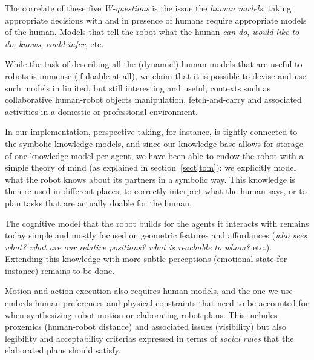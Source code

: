 \documentclass[preprint,3p,times]{elsarticle}
\begin{document}
The correlate of these five \emph{W-questions} is the issue the \emph{human
models}: taking appropriate decisions with and in presence of humans require
appropriate models of the human. Models that tell the robot what the human
\emph{can do}, \emph{would like to do}, \emph{knows}, \emph{could infer}, etc.

While the task of describing all the (dynamic!) human models that are useful to
robots is immense (if doable at all), we claim that it is possible to devise and
use such models in limited, but still interesting and useful, contexts such as
collaborative human-robot objects manipulation, fetch-and-carry and associated
activities in a domestic or professional environment.

In our implementation, perspective taking, for instance, is tightly connected to
the symbolic knowledge models, and since our knowledge base allows for storage
of one knowledge model per agent, we have been able to endow the robot with a
simple theory of mind (as explained in section~\ref{sect|tom}): we explicitly
model what the robot knows about its partners in a symbolic way. This knowledge
is then re-used in different places, to correctly interpret what the human says,
or to plan tasks that are actually doable for the human.

The cognitive model that the robot builds for the agents it interacts with
remains today simple and mostly focused on geometric features and affordances
(\emph{who sees what? what are our relative positions? what is reachable to
whom?}  etc.). Extending this knowledge with more subtle perceptions (emotional
state for instance) remains to be done.

Motion and action execution also requires human models, and the one we use
embeds human preferences and physical constraints that need to be accounted for
when synthesizing robot motion or elaborating robot plans. This includes
proxemics (human-robot distance) and associated issues (visibility) but also
legibility and acceptability criterias expressed in terms of \emph{social rules}
that the elaborated plans should satisfy.
\end{document}

